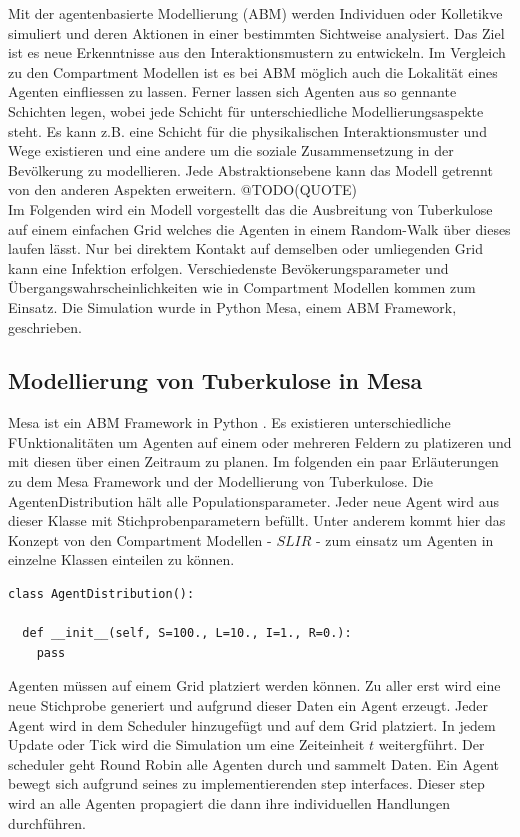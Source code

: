 \documentclass[paper=a4, fontsize=11pt, ngerman, abstract=on]{scrartcl}
\numberwithin{equation}{section} %
\numberwithin{figure}{section} %
\numberwithin{table}{section} %
\begin{document}
Mit der agentenbasierte Modellierung (ABM) werden Individuen oder Kolletikve simuliert und deren Aktionen in einer bestimmten Sichtweise analysiert. Das Ziel ist es neue Erkenntnisse aus den Interaktionsmustern zu entwickeln. Im Vergleich zu den Compartment Modellen ist es bei ABM möglich auch die Lokalität eines Agenten einfliessen zu lassen. Ferner lassen sich Agenten aus so gennante Schichten legen, wobei jede Schicht für unterschiedliche Modellierungsaspekte steht. Es kann z.B. eine Schicht für die physikalischen Interaktionsmuster und Wege existieren und eine andere um die soziale Zusammensetzung in der Bevölkerung zu modellieren. Jede Abstraktionsebene kann das Modell getrennt von den anderen Aspekten erweitern. @TODO(QUOTE) \\

Im Folgenden wird ein Modell vorgestellt das die Ausbreitung von Tuberkulose auf einem einfachen Grid welches die Agenten in einem Random-Walk über dieses laufen lässt. Nur bei direktem Kontakt auf demselben oder umliegenden Grid kann eine Infektion erfolgen. Verschiedenste Bevökerungsparameter und Übergangswahrscheinlichkeiten wie in Compartment Modellen kommen zum Einsatz. Die Simulation wurde in Python Mesa, einem ABM Framework, geschrieben.

\subsection{Modellierung von Tuberkulose in Mesa}

Mesa ist ein ABM Framework in Python \cite{Mesa}. Es existieren unterschiedliche FUnktionalitäten um Agenten auf einem oder mehreren Feldern zu platizeren und mit diesen über einen Zeitraum zu planen. Im folgenden ein paar Erläuterungen zu dem Mesa Framework und der Modellierung von Tuberkulose. Die AgentenDistribution hält alle Populationsparameter. Jeder neue Agent wird aus dieser Klasse mit Stichprobenparametern befüllt. Unter anderem kommt hier das Konzept von den Compartment Modellen - $SLIR$ - zum einsatz um Agenten in einzelne Klassen einteilen zu können.

\begin{lstlisting}[style=python]
class AgentDistribution():

  def __init__(self, S=100., L=10., I=1., R=0.):
    pass
\end{lstlisting}

Agenten müssen auf einem Grid platziert werden können. Zu aller erst wird eine neue Stichprobe generiert und aufgrund dieser Daten ein Agent erzeugt. Jeder Agent wird in dem Scheduler hinzugefügt und auf dem Grid platziert. In jedem Update oder Tick wird die Simulation um eine Zeiteinheit $t$ weitergführt. Der scheduler geht Round Robin alle Agenten  durch und sammelt Daten. Ein Agent bewegt sich aufgrund seines zu implementierenden step interfaces. Dieser step wird an alle Agenten propagiert die dann ihre individuellen Handlungen durchführen.
\end{document}
